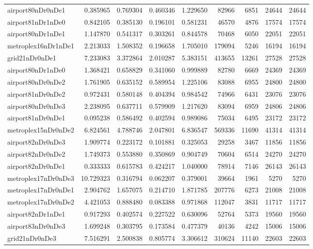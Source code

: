 \documentclass[../../../thesis.tex]{subfiles}
\begin{document}
\begin{longtable}{|l|r|r|r|r|r|r|r|r|}
airport80nDr0nDe1 & 0.385965 & 0.769304 & 0.460346 & 1.229650 & 82966 & 6851 & 24644 & 24644 \\
airport81nDr1nDe0 & 0.842105 & 0.385130 & 0.196101 & 0.581231 & 46570 & 4876 & 17574 & 17574 \\
airport80nDr1nDe1 & 1.147870 & 0.541317 & 0.303261 & 0.844578 & 70468 & 6050 & 22051 & 22051 \\
metroplex16nDr1nDe1 & 2.213033 & 1.508352 & 0.196658 & 1.705010 & 179094 & 5246 & 16194 & 16194 \\
grid21nDr0nDe1 & 7.233083 & 3.372864 & 2.010287 & 5.383151 & 413655 & 13261 & 27528 & 27528 \\
airport80nDr1nDe0 & 1.368421 & 0.658829 & 0.341060 & 0.999889 & 82780 & 6669 & 24369 & 24369 \\
airport80nDr0nDe2 & 1.761905 & 0.635152 & 0.589954 & 1.225106 & 83088 & 6955 & 24800 & 24800 \\
airport81nDr0nDe2 & 0.972431 & 0.580148 & 0.404394 & 0.984542 & 74966 & 6431 & 23076 & 23076 \\
airport80nDr0nDe3 & 2.238095 & 0.637711 & 0.579909 & 1.217620 & 83094 & 6959 & 24806 & 24806 \\
airport81nDr0nDe1 & 0.095238 & 0.586492 & 0.402594 & 0.989086 & 75034 & 6495 & 23172 & 23172 \\
metroplex15nDr0nDe2 & 6.824561 & 4.788746 & 2.047801 & 6.836547 & 569336 & 11690 & 41314 & 41314 \\
airport82nDr0nDe3 & 1.909774 & 0.223172 & 0.101881 & 0.325053 & 29258 & 3467 & 11856 & 11856 \\
airport82nDr0nDe2 & 1.749373 & 0.553880 & 0.350869 & 0.904749 & 70604 & 6514 & 24270 & 24270 \\
airport82nDr0nDe1 & 0.333333 & 0.615783 & 0.424217 & 1.040000 & 78914 & 7146 & 26143 & 26143 \\
metroplex17nDr0nDe3 & 10.729323 & 0.316794 & 0.062207 & 0.379001 & 39664 & 1961 & 5270 & 5270 \\
metroplex17nDr0nDe1 & 2.904762 & 1.657075 & 0.214710 & 1.871785 & 207776 & 6273 & 21008 & 21008 \\
metroplex17nDr0nDe2 & 4.421053 & 0.888480 & 0.083388 & 0.971868 & 112047 & 3831 & 11717 & 11717 \\
airport82nDr1nDe1 & 0.917293 & 0.402574 & 0.227522 & 0.630096 & 52764 & 5373 & 19560 & 19560 \\
airport83nDr0nDe3 & 1.699248 & 0.303795 & 0.173584 & 0.477379 & 40136 & 4242 & 15006 & 15006 \\
grid21nDr0nDe3 & 7.516291 & 2.500838 & 0.805774 & 3.306612 & 310624 & 11140 & 22603 & 22603 \\

\end{longtable}
\end{document}

